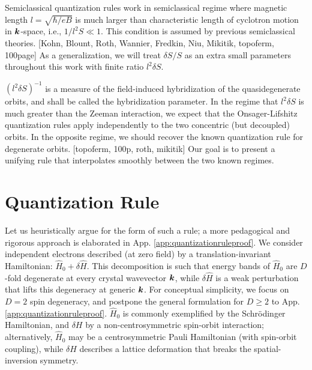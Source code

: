 \documentclass[aps, prb, showpacs, twocolumn, notitlepage, superscriptaddress]{revtex4-1}
\begin{document}
Semiclassical quantization rules work in semiclassical regime where magnetic length $l=\sqrt{\hbar/eB}$ is much larger than characteristic length of cyclotron motion in $\boldsymbol{k}$-space, i.e., $1/l^2 S\ll 1$. This condition is assumed by previous semiclassical theories. [Kohn, Blount, Roth, Wannier, Fredkin, Niu, Mikitik, topoferm, 100page] As a generalization, we will treat $\delta S/S$ as an extra small parameters throughout this work with finite ratio $l^2\delta S$. 

$(l^2\delta S)^{-1}$ is a measure of the field-induced hybridization of the quasidegenerate orbits, and shall be called the hybridization parameter. 
In the regime that $l^2\delta S$ is much greater than the Zeeman interaction, we expect that the Onsager-Lifshitz quantization rules apply independently to the two concentric (but decoupled) orbits. In the opposite regime, we should recover the known quantization rule for degenerate orbits. [topoferm, 100p, roth, mikitik] Our goal is to present a unifying rule that interpolates smoothly between the two known regimes.

\section{Quantization Rule\label{sec:qtznrules}}

Let us heuristically argue for the form of such a rule; a more pedagogical and rigorous approach is elaborated in App. \ref{app:quantizationruleproof}. We consider independent electrons described (at zero field) by a translation-invariant Hamiltonian: $\hat{H}_0{+}\delta \hat{H}$. This decomposition is such that energy bands of $\hat{H}_0$ are $D$-fold degenerate at every crystal wavevector $\boldsymbol{k}$, while $\delta \hat{H}$ is a weak perturbation that lifts this degeneracy at generic $\boldsymbol{k}$. For conceptual simplicity, we focus on $D{=}2$ spin degeneracy, and postpone the general formulation for $D{\geq}2$ to App. \ref{app:quantizationruleproof}.  $\hat{H}_0$ is commonly exemplified by  the Schr\"odinger Hamiltonian, and $\delta H$ by a non-centrosymmetric spin-orbit interaction; alternatively, $\hat{H}_0$ may be a centrosymmetric Pauli Hamiltonian (with spin-orbit coupling), while $\delta H$ describes a lattice deformation that breaks the spatial-inversion symmetry.  

\end{document}
